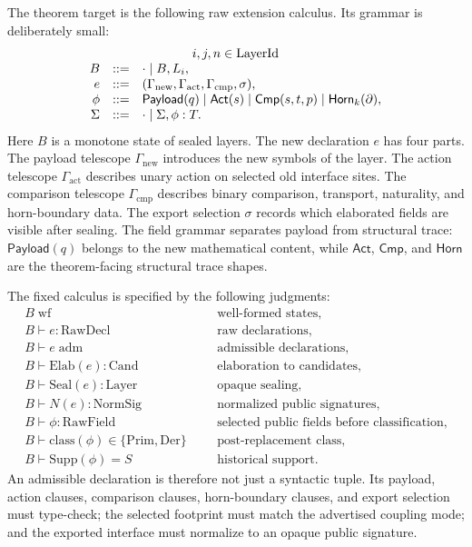 \documentclass{lmcs}
\newcommand{\Prim}{\mathrm{Prim}}
\newcommand{\Der}{\mathrm{Der}}
\newcommand{\Supp}{\mathrm{Supp}}
\begin{document}
The theorem target is the following raw extension calculus.  Its grammar is deliberately
small:
\[
\begin{array}{rcl}
\multicolumn{3}{c}{i,j,n \in \mathrm{LayerId}}\\
B &::=& \cdot \mid B,L_i,\\
e &::=& (\Gamma_{\mathrm{new}},\Gamma_{\mathrm{act}},
          \Gamma_{\mathrm{cmp}},\sigma),\\
\phi &::=&
  \mathsf{Payload}(q)
  \mid \mathsf{Act}(s)
  \mid \mathsf{Cmp}(s,t,p)
  \mid \mathsf{Horn}_k(\partial),\\
\Sigma &::=& \cdot \mid \Sigma,\phi:T.
\end{array}
\]
Here \(B\) is a monotone state of sealed layers.  The new declaration \(e\) has four parts.
The payload telescope \(\Gamma_{\mathrm{new}}\) introduces the new symbols of the layer.  The
action telescope \(\Gamma_{\mathrm{act}}\) describes unary action on selected old interface
sites.  The comparison telescope \(\Gamma_{\mathrm{cmp}}\) describes binary comparison,
transport, naturality, and horn-boundary data.  The export selection \(\sigma\) records which
elaborated fields are visible after sealing.  The field grammar separates payload from
structural trace: \(\mathsf{Payload}(q)\) belongs to the new mathematical content, while
\(\mathsf{Act}\), \(\mathsf{Cmp}\), and \(\mathsf{Horn}\) are the theorem-facing structural
trace shapes.

The fixed calculus is specified by the following judgments:
\[
\begin{array}{rcll}
  B\;\mathrm{wf} &&& \text{well-formed states},\\
  B\vdash e:\mathrm{RawDecl} &&& \text{raw declarations},\\
  B\vdash e\;\mathrm{adm} &&& \text{admissible declarations},\\
  B\vdash \mathrm{Elab}(e):\mathrm{Cand} &&& \text{elaboration to candidates},\\
  B\vdash \mathrm{Seal}(e):\mathrm{Layer} &&& \text{opaque sealing},\\
  B\vdash N(e):\mathrm{NormSig} &&& \text{normalized public signatures},\\
  B\vdash \phi:\mathrm{RawField} &&& \text{selected public fields before classification},\\
  B\vdash \mathrm{class}(\phi)\in\{\Prim,\Der\}
    &&& \text{post-replacement class},\\
  B\vdash \Supp(\phi)=S &&& \text{historical support}.
\end{array}
\]
An admissible declaration is therefore not just a syntactic tuple.  Its payload, action
clauses, comparison clauses, horn-boundary clauses, and export selection must type-check;
the selected footprint must match the advertised coupling mode; and the exported interface
must normalize to an opaque public signature.
\end{document}

